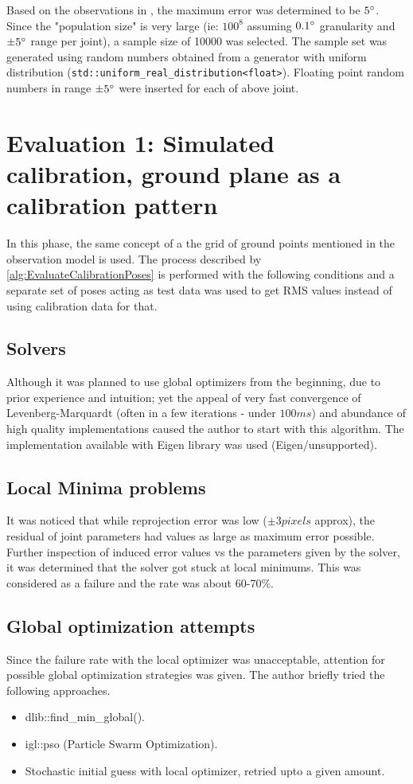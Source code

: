 \documentclass[english, printversion, nomenclature, notitle]{tuvisionthesis} %
\begin{document}
Based on the observations in , the maximum error was determined to be $5\degree$. Since the "population size" is very large (ie: $100^8$ assuming $0.1\degree$ granularity and $\pm5\degree$ range per joint), a sample size of 10000 was selected. The sample set was generated using random numbers obtained from a generator with uniform distribution (\lstinline{std::uniform_real_distribution<float>}). Floating point random numbers in range $\pm5\degree$ were inserted for each of above joint. 

\section{Evaluation 1: Simulated calibration, ground plane as a calibration pattern}
\label{subsec:simGroundTest}
In this phase, the same concept of a the grid of ground points mentioned in the observation model is used. The process described by \cref{alg:EvaluateCalibrationPoses} is performed with the following conditions and a separate set of poses acting as test data was used to get RMS values instead of using calibration data for that.


\subsection{Solvers}

Although it was planned to use global optimizers from the beginning, due to prior experience and intuition; yet the appeal of very fast convergence of Levenberg-Marquardt (often in a few iterations - under $100ms$) and abundance of high quality implementations caused the author to start with this algorithm. The implementation available with Eigen library was used (Eigen/unsupported).

\subsection{Local Minima problems}
It was noticed that while reprojection error was low ($\pm3 pixels$ approx), the residual of joint parameters had values as large as maximum error possible. Further inspection of induced error values vs the parameters given by the solver, it was determined that the solver got stuck at local minimums. This was considered as a failure and the rate was about 60-70\%.

\subsection{Global optimization attempts}
Since the failure rate with the local optimizer was unacceptable, attention for possible global optimization strategies was given. The author briefly tried the following approaches.
\begin{itemize}
	\item dlib::find\_min\_global(). 
	\item igl::pso (Particle Swarm Optimization). 
	\item Stochastic initial guess with local optimizer, retried upto a given amount.
\end{itemize}
\end{document}
